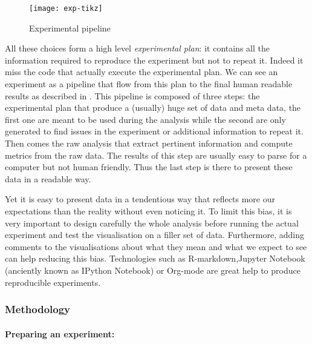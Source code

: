 \begin{figure}[htb]
    \centering
    \texttt{[image: exp-tikz]}
    \caption{Experimental pipeline}
    \label{fig:exp-pipeline}
\end{figure}

All these choices form a high level \emph{experimental plan}: it contains all
the information required to reproduce the experiment but not to repeat it.
Indeed it miss the code that actually execute the experimental plan.
We can see an experiment as a pipeline that flow from this plan to the final
human readable results as described in . This pipeline is
composed of three steps: the experimental plan that produce a (usually) huge
set of data and meta data, the first one are meant to be used during the
analysis while the second are only generated to find issues in the experiment or
additional information to repeat it. Then comes the raw analysis that extract
pertinent information and compute metrics from the raw data. The results of
this step are usually easy to parse for a computer but not human friendly.
Thus the last step is there to present these data in a readable way.

Yet it is easy to present data in a tendentious way that reflects more our
expectations than the reality without even noticing it. To limit this bias,
it is very important to design carefully the whole analysis before running the
actual experiment and test the visualisation on a filler set of data.
Furthermore, adding comments to the visualisations about what they mean and
what we expect to see can help reducing this bias. Technologies such as
\gls{R-markdown},Jupyter Notebook (anciently known as IPython
Notebook) or \gls{Org-mode} are great help to produce reproducible
experiments.

\subsubsection{Methodology}

\paragraph{Preparing an experiment:}

